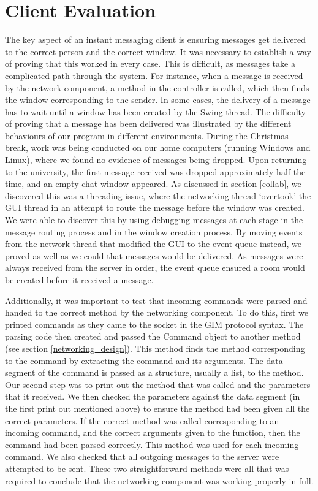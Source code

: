 \section{Client Evaluation}
\label{client_eval}

The key aspect of an instant messaging client is ensuring messages get delivered to the correct person and the correct window. It was necessary to establish a way of proving that this worked in every case. This is difficult, as messages take a complicated path through the system. For instance, when a message is received by the network component, a method in the controller is called, which then finds the window corresponding to the sender. In some cases, the delivery of a message has to wait until a window has been created by the Swing thread. The difficulty of proving that a message has been delivered was illustrated by the different behaviours of our program in different environments. During the Christmas break, work was being conducted on our home computers (running Windows and Linux), where we found no evidence of messages being dropped. Upon returning to the university, the first message received was dropped approximately half the time, and an empty chat window appeared. As discussed in section \ref{collab}, we discovered this was a threading issue, where the networking thread `overtook' the GUI thread in an attempt to route the message before the window was created. We were able to discover this by using debugging messages at each stage in the message routing process and in the window creation process. By moving events from the network thread that modified the GUI to the event queue instead, we proved as well as we could that messages would be delivered. As messages were always received from the server in order, the event queue ensured a room would be created before it received a message. 

Additionally, it was important to test that incoming commands were parsed and handed to the correct method by the networking component. To do this, first we printed commands as they came to the socket in the GIM protocol syntax. The parsing code then created and passed the Command object to another method (see section \ref{networking_design}). This method finds the method corresponding to the command by extracting the command and its arguments. The data segment of the command is passed as a structure, usually a list, to the method. Our second step was to print out the method that was called and the parameters that it received. We then checked the parameters against the data segment (in the first print out mentioned above) to ensure the method had been given all the correct parameters. If the correct method was called corresponding to an incoming command, and the correct arguments given to the function, then the command had been parsed correctly. This method was used for each incoming command. We also checked that all outgoing messages to the server were attempted to be sent. These two straightforward methods were all that was required to conclude that the networking component was working properly in full.

